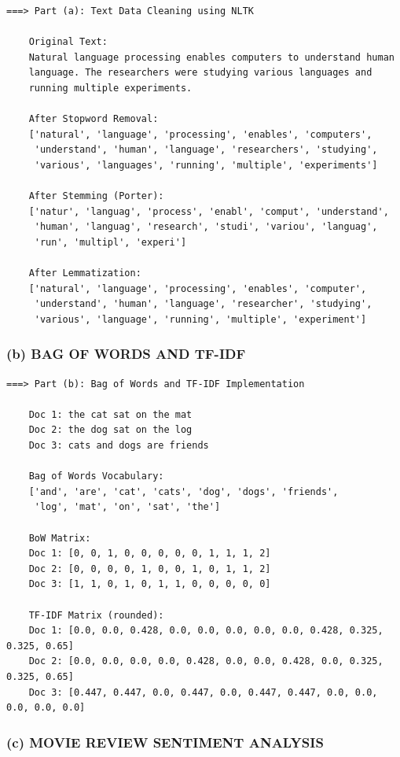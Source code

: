 \documentclass[12pt,a4paper]{article}
\begin{document}
\begin{lstlisting}[style=outputstyle]
===> Part (a): Text Data Cleaning using NLTK

    Original Text:
    Natural language processing enables computers to understand human
    language. The researchers were studying various languages and
    running multiple experiments.

    After Stopword Removal:
    ['natural', 'language', 'processing', 'enables', 'computers',
     'understand', 'human', 'language', 'researchers', 'studying',
     'various', 'languages', 'running', 'multiple', 'experiments']

    After Stemming (Porter):
    ['natur', 'languag', 'process', 'enabl', 'comput', 'understand',
     'human', 'languag', 'research', 'studi', 'variou', 'languag',
     'run', 'multipl', 'experi']

    After Lemmatization:
    ['natural', 'language', 'processing', 'enables', 'computer',
     'understand', 'human', 'language', 'researcher', 'studying',
     'various', 'language', 'running', 'multiple', 'experiment']
\end{lstlisting}

\subsubsection*{(b) BAG OF WORDS AND TF-IDF}

\begin{lstlisting}[style=outputstyle]
===> Part (b): Bag of Words and TF-IDF Implementation

    Doc 1: the cat sat on the mat
    Doc 2: the dog sat on the log
    Doc 3: cats and dogs are friends

    Bag of Words Vocabulary:
    ['and', 'are', 'cat', 'cats', 'dog', 'dogs', 'friends',
     'log', 'mat', 'on', 'sat', 'the']

    BoW Matrix:
    Doc 1: [0, 0, 1, 0, 0, 0, 0, 0, 1, 1, 1, 2]
    Doc 2: [0, 0, 0, 0, 1, 0, 0, 1, 0, 1, 1, 2]
    Doc 3: [1, 1, 0, 1, 0, 1, 1, 0, 0, 0, 0, 0]

    TF-IDF Matrix (rounded):
    Doc 1: [0.0, 0.0, 0.428, 0.0, 0.0, 0.0, 0.0, 0.0, 0.428, 0.325, 0.325, 0.65]
    Doc 2: [0.0, 0.0, 0.0, 0.0, 0.428, 0.0, 0.0, 0.428, 0.0, 0.325, 0.325, 0.65]
    Doc 3: [0.447, 0.447, 0.0, 0.447, 0.0, 0.447, 0.447, 0.0, 0.0, 0.0, 0.0, 0.0]
\end{lstlisting}

\subsubsection*{(c) MOVIE REVIEW SENTIMENT ANALYSIS}
\end{document}
